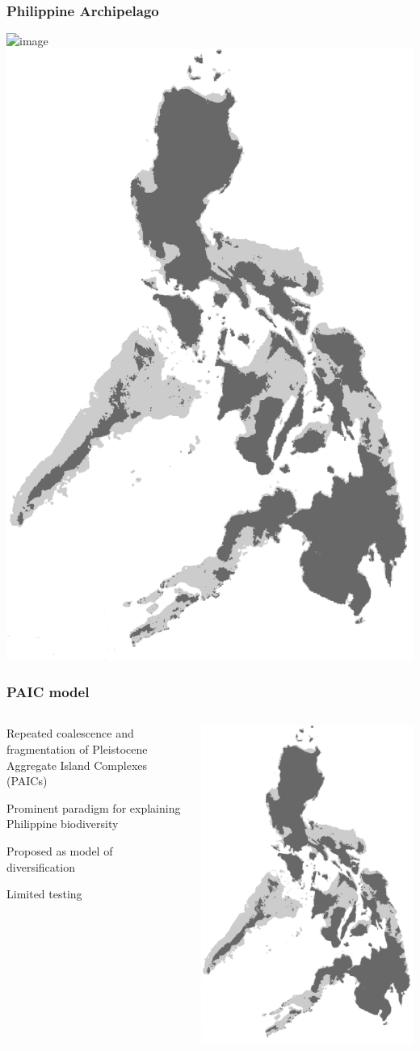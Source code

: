 \begin{frame}
    \frametitle{Philippine Archipelago}
    \begin{center}
        \includegraphics<1>[width=.5\textwidth]{images/maps/Philippines-present.png}
        \includegraphics<2>[width=.5\textwidth]{images/maps/Philippines.png}
    \end{center}
\end{frame}

\begin{frame}
    \frametitle{PAIC model}
    \begin{columns}[c]
            \begin{myitemize}
                \item Repeated coalescence and fragmentation of Pleistocene
                    Aggregate Island Complexes (PAICs)
                \item Prominent paradigm for explaining Philippine biodiversity
                \item Proposed as model of diversification
                \begin{myitemize}
                    \item Limited testing
                \end{myitemize}
            \end{myitemize}
            \includegraphics[width=\textwidth]{images/maps/Philippines.png}

\end{columns}
\end{frame}
